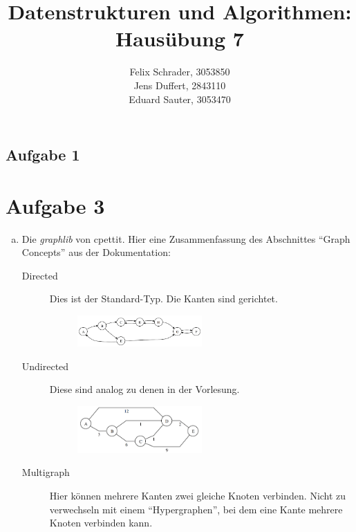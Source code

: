 \documentclass[11pt]{article}
\author{
  Felix Schrader, 3053850 \\ 
  Jens Duffert, 2843110 \\
  Eduard Sauter, 3053470
}
\title{Datenstrukturen und Algorithmen: Haus\"ubung 7}
\begin{document}
\maketitle
\subsection*{Aufgabe 1}
  


  \newpage
\section*{Aufgabe 3}
\begin{enumerate}[a)]

  \item Die \emph{graphlib} von cpettit. Hier eine Zusammenfassung des
    Abschnittes ``Graph Concepts'' aus der Dokumentation:
    \begin{description}
      \item[Directed] 
        Dies ist der Standard-Typ. Die Kanten sind gerichtet.

        \begin{figure}[h!]
          \centering
          \includegraphics[width=0.5\textwidth]{./tarjan.png}
          \label{fig:}
        \end{figure}

      \item[Undirected]
        Diese sind analog zu denen in der Vorlesung.

        \begin{figure}[h!]
          \centering
          \includegraphics[width=0.5\textwidth]{prim-input.png}
          \label{fig:input}
        \end{figure}

      \item[Multigraph]
        Hier k\"onnen mehrere Kanten zwei gleiche Knoten verbinden. Nicht
        zu verwechseln mit einem ``Hypergraphen'', bei dem eine Kante mehrere
        Knoten verbinden kann.


\end{description}
\end{enumerate}
\end{document}
